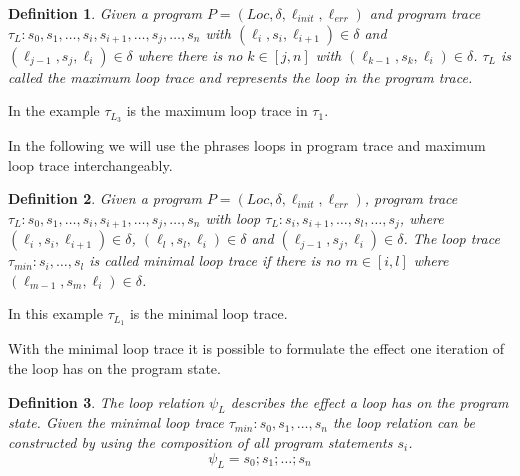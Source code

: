 \documentclass{article}
\newcommand{\Loc}{\ensuremath{\mathit{Loc}}\xspace}
\newcommand{\err}{\ensuremath{\mathit{err}}\xspace}
\newcommand{\init}{\ensuremath{\mathit{init}}\xspace}
\newcommand{\loc}[1]{\ensuremath{\ell_{#1}}}
\newcounter{example}[section]
\newtheorem{mydef}{Definition}
\newcommand\mycom[1]{}
\newcommand\mycom[1]{#1}
\newcommand{\dd}[1]{\mycom{\todo[color=orange!40,inline]{\small DD: #1}}}
\newcommand{\ts}[1]{\mycom{\todo[color=green!40,inline]{\small TS: #1}}}
\begin{document}
\begin{mydef}
	Given a program $P = (\Loc, \delta, \ell_\init, \ell_\err)$ and program trace \\ $\tau_L: s_0, s_1, \ldots, s_i, s_{i+1}, \ldots, s_j, \ldots, s_n$ with $(\loc{i}, s_i, \loc{i+1}) \in \delta$ and $(\loc{j-1}, s_j, \loc{i}) \in \delta$ where there is no $k \in [j, n]$ with $(\loc{k-1}, s_k, \loc{i}) \in \delta$. $\tau_L$ is called the maximum loop trace and represents the loop in the program trace.
\end{mydef}
\ts{In the definition above, a loop trace is a sub trace starting with the loop head.
	Shouldn't $\tau_L$ then also start with the loop head?
	Otherwise, $\tau_{L_3}$ does not match the definition.}
In the example $\tau_{L_3}$ is the maximum loop trace in $\tau_1$.
\dd{which example?}
In the following we will use the phrases loops in program trace and maximum loop trace interchangeably.

\begin{mydef}
	Given a program $P = (\Loc, \delta, \ell_\init, \ell_\err)$, program trace \\ $\tau_L: s_0, s_1, \ldots, s_i, s_{i+1}, \ldots, s_j, \ldots, s_n$ with loop $\tau_L: s_i, s_{i+1}, \ldots, s_l, \ldots, s_j$, where $(\loc{i}, s_i, \loc{i+1}) \in \delta$, $(\loc{l}, s_l, \loc{i}) \in \delta$ and $(\loc{j-1}, s_j, \loc{i}) \in \delta$. The loop trace $\tau_{min}: s_i, \ldots, s_l$ is called minimal loop trace if there is no $m \in [i, l]$ where $(\loc{m-1}, s_m, \loc{i}) \in \delta$.
\end{mydef}
\ts{Complicated. I don't think you need a loop containing another loop for this definition.}

In this example $\tau_{L_1}$ is the minimal loop trace.
\dd{which example?}

With the minimal loop trace it is possible to formulate the effect one iteration of the loop has on the program state.
\begin{mydef}
	The loop relation $\psi_L$ describes the effect a loop has on the program state.
	Given the minimal loop trace $\tau_{min}: s_0, s_1, \ldots, s_{n}$ the loop relation can be constructed by using the composition of all program statements $s_i$.
	\begin{equation*}
		\psi_L = s_0; s_1; \ldots; s_n
	\end{equation*}
\end{mydef}
\end{document}
